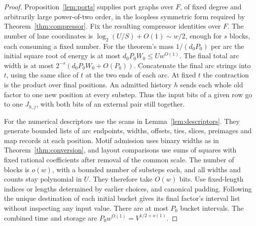 \begin{proof}
Proposition~\ref{lem:ports} supplies port graphs over $F$, of fixed
degree and arbitrarily large power-of-two order, in the loopless symmetric
form required by Theorem~\ref{thm:compressor}. Fix the resulting compressor
identities over $F$.
The number of lane coordinates is $\log_2(U/S)+O(1)\sim w/2$, enough
for $s$ blocks, each consuming a fixed number. For the theorem's mass
$1/(d_0P_0)$ per arc the initial square root of energy is at most
$d_0P_0W_0\le Uw^{O(1)}$. The final total arc width is at most
$2^{-s}(d_0P_0W_0+O(P_0))$. Concatenate the final arc strings into $t$, using the same slice of
$t$ at the two ends of each arc. At fixed $t$ the contraction is the
product over final positions. An admitted history $h$ sends each whole
old factor to one new position at every substep. Thus the input bits
of a given row go to one $J_{h,j}$, with both bits of an external pair
still together.

For the numerical descriptors use the scans in Lemma~\ref{lem:descriptors}.
They generate bounded lists of arc endpoints, widths, offsets, ties,
slices, preimages and map records at each position. Motif admission uses
binary widths as in Theorem~\ref{thm:conversion}, and layout comparisons use
sums of squares with fixed rational coefficients after removal of the
common scale. The number of blocks is $o(w)$, with a bounded number of
substeps each, and all widths and counts stay polynomial in $U$.
They therefore take $O(w)$ bits. Use fixed-length indices or lengths
determined by earlier choices, and canonical padding. Following the
unique destination of each initial bucket gives its final factor's
interval list without inspecting any input value. There are at most
$P_0$ bucket intervals. The combined time and storage are
$P_0w^{O(1)}=V^{1/2+o(1)}$.


\end{proof}
